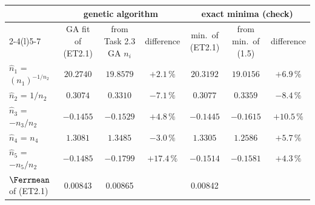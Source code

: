 \begin{tabular}{@{}l c c c c c c@{}}
\toprule
 & \multicolumn{3}{c}{genetic algorithm} & \multicolumn{3}{c}{exact minima (check)}\\
\cmidrule(lr){2-4}\cmidrule(l){5-7}
 & GA fit of (ET2.1) & from Task 2.3 GA $n_i$ & difference & min.\ of (ET2.1) & from min.\ of (1.5) & difference\\
\midrule
$\hat n_1$ = $(n_1)^{-1/n_2}$ & $20.2740$ & $19.8579$ & $+2.1\,\%$ & $20.3192$ & $19.0156$ & $+6.9\,\%$\\
$\hat n_2$ = $1/n_2$ & $0.3074$ & $0.3310$ & $-7.1\,\%$ & $0.3077$ & $0.3359$ & $-8.4\,\%$\\
$\hat n_3$ = $-n_3/n_2$ & $-0.1455$ & $-0.1529$ & $+4.8\,\%$ & $-0.1445$ & $-0.1615$ & $+10.5\,\%$\\
$\hat n_4$ = $n_4$ & $1.3081$ & $1.3485$ & $-3.0\,\%$ & $1.3305$ & $1.2586$ & $+5.7\,\%$\\
$\hat n_5$ = $-n_5/n_2$ & $-0.1485$ & $-0.1799$ & $+17.4\,\%$ & $-0.1514$ & $-0.1581$ & $+4.3\,\%$\\
\midrule
$\Ferrmean$ of (ET2.1) & 0.00843 & 0.00865 & & 0.00842 & & \\
\bottomrule
\end{tabular}
